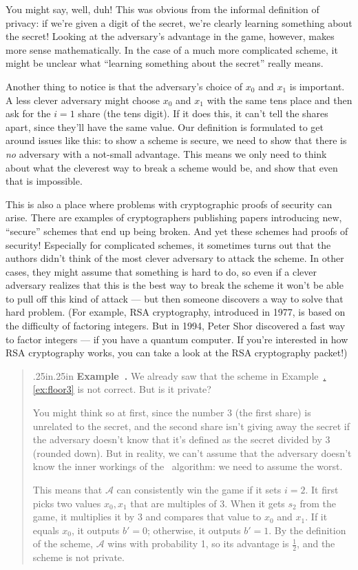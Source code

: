 \documentclass[12 pt]{article}
\def\A{\ensuremath{\mathcal{A}}}
\newcommand{\exref}[1]{\hyperref[#1]{\thesection.\ref*{#1}}}
\newcounter{example}[section]
\newenvironment{example}{\refstepcounter{example}\par\bigskip \begin{quotation}{}{\leftmargin .25in\rightmargin .25in}
    \noindent \textbf{Example~\thesection.\theexample }  \rmfamily}{\end{quotation}\par\bigskip}
\begin{document}
You might say, well, duh! This was obvious from the informal definition 
of privacy: if we're given a digit of the secret, we're clearly learning 
something about the secret! Looking at the adversary's advantage in the 
game, however, makes more sense mathematically. In the case of a much 
more complicated scheme, it might be unclear what ``learning something 
about the secret'' really means.

Another thing to notice is that the adversary's choice of $x_0$ and $x_1$
is important. A less clever adversary might choose $x_0$ and $x_1$ with 
the same tens place and then ask for the $i=1$ share (the tens digit).
If it does this, it can't tell the shares apart, since they'll have the same
value. Our definition is formulated to get around issues like this: to 
show a scheme is secure, we need to show that there is \emph{no} adversary 
with a not-small advantage. This means we only need to think about what the 
cleverest way to break a scheme would be, and show that even that is 
impossible.

This is also a place where problems with cryptographic proofs of security 
can arise. There are examples of cryptographers publishing papers 
introducing new, ``secure'' schemes that end up being broken. And yet 
these schemes had proofs of security! Especially for complicated schemes, 
it sometimes turns out that the authors didn't think of the most clever 
adversary to attack the scheme. In other cases, they might assume that 
something is hard to do, so even if a clever adversary realizes that this 
is the best way to break the scheme it won't be able to pull off this 
kind of attack --- but then someone discovers a way to solve that 
hard problem. (For example, RSA cryptography, introduced in 1977\cite{rsa},
is based on the difficulty of factoring integers. But in 1994, Peter Shor 
discovered a fast way to factor integers\cite{shor} --- if you have a 
quantum computer. If you're interested in how RSA cryptography works, 
you can take a look at the RSA cryptography packet!)

\begin{example}
    We already saw that the scheme in Example~\exref{ex:floor3} is not correct.
    But is it private?

    You might think so at first, since the number 3 (the first share) is
    unrelated to the secret, and the second share isn't giving away the 
    secret if the adversary doesn't know that it's defined as the secret 
    divided by 3 (rounded down).
    But in reality, we can't assume that the adversary doesn't know the 
    inner workings of the \share~algorithm: we need to assume the worst.
    
    This means that $\A$ can consistently win the game if it sets $i = 2$.
    It first picks two values $x_0, x_1$ that are multiples of 3.
    When it gets $s_2$ from the game, it multiplies it by 3 and compares that 
    value to $x_0$ and $x_1$. If it equals $x_0$, it outputs $b' = 0$; 
    otherwise, it outputs $b' = 1$. By the definition of the scheme, $\A$ 
    wins with probability 1, so its advantage is $\frac{1}{2}$, and the 
    scheme is not private.
\end{example}
\end{document}
